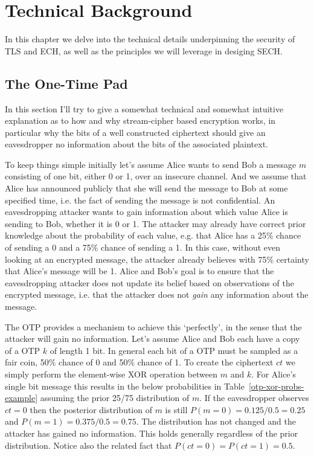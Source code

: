 \chapter{Technical Background}
In this chapter we delve into the technical details underpinning
the security of \ac{TLS} and \ac{ECH},
as well as the principles we will leverage in desiging \ac{SECH}.

\section{The One-Time Pad}
In this section I'll try to give a somewhat technical and somewhat intuitive explanation as to how and why stream-cipher based encryption works,
in particular why the bits of a well constructed ciphertext should give an eavesdropper no information about the bits of the associated plaintext.

To keep things simple initially let's assume Alice wants to send Bob a message $m$ consisting of one bit, either 0 or 1, over an insecure channel.
And we assume that Alice has announced publicly that she will send the message to Bob
at some specified time, i.e. the fact of sending the message is not confidential.
An eavesdropping attacker wants to gain information about which value Alice is sending to Bob, whether it is 0 or 1.
The attacker may already have correct prior knowledge about the probability of each value,
e.g. that Alice has a 25\% chance of sending a 0 and a 75\% chance of sending a 1.
In this case, without even looking at an encrypted message, the attacker already believes with 75\% certainty that Alice's message will be 1.
Alice and Bob's goal is to ensure that the eavesdropping attacker does not update its belief based on observations of the encrypted message,
i.e. that the attacker does not {\em gain} any information about the message.

The \ac{OTP} provides a mechanism to achieve this `perfectly', in the sense that
the attacker will gain no information.
Let's assume Alice and Bob each have a copy of a \ac{OTP} $k$ of length 1 bit.
In general each bit of a \ac{OTP} must be sampled as a fair coin, 50\% chance of 0 and 50\% chance of 1.
To create the ciphertext $ct$ we simply perform the element-wise \ac{XOR} operation between $m$ and $k$.
For Alice's single bit message this results in the below probabilities in Table~\ref{otp-xor-probs-example} assuming the prior 25/75 distribution of $m$.
If the eavesdropper observes $ct=0$ then the posterior distribution of $m$ is still $P(m=0)=0.125/0.5=0.25$ and $P(m=1)=0.375/0.5=0.75$.
The distribution has not changed and the attacker has gained no information.
This holds generally regardless of the prior distribution.
Notice also the related fact that $P(ct=0)=P(ct=1)=0.5$.

